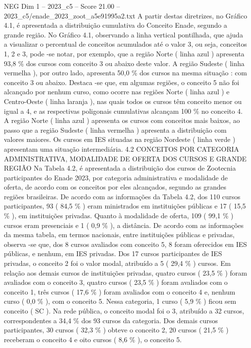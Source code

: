 \begin{textsample}{NEG Dim 1 – 2023\_c5 – Score 21.00 – 2023\_c5/enade\_2023\_zoot\_a5e91995a2.txt}
A partir destas diretrizes, no Gráfico 4.1, é apresentada a distribuição cumulativa do Conceito Enade, segundo a grande região.
No Gráfico 4.1, observando a linha vertical pontilhada, que ajuda a visualizar o percentual de conceitos acumulados até o valor 3, ou seja, conceitos 1, 2 e 3, pode -se notar, por exemplo, que a região Norte ( linha azul ) apresenta 93,8 \% dos cursos com conceito 3 ou abaixo deste valor.
A região Sudeste ( linha vermelha ), por outro lado, apresenta 50,0 \% dos cursos na mesma situação : com conceito 3 ou abaixo.
Destaca -se que, em algumas regiões, o conceito 5 não foi alcançado por nenhum curso, como ocorre nas regiões Norte ( linha azul ) e Centro-Oeste ( linha laranja ), nas quais todos os cursos têm conceito menor ou igual a 4, e as respectivas poligonais cumulativas alcançam 100 \% no conceito 4.
A região Norte ( linha azul ) apresenta os cursos com conceitos mais baixos, ao passo que a região Sudeste ( linha vermelha ) apresenta a distribuição com valores maiores.
Os cursos em IES situadas na região Nordeste ( linha verde ) apresentam uma situação intermediária. 4.2 CONCEITOS POR CATEGORIA ADMINISTRATIVA, MODALIDADE DE OFERTA DOS CURSOS E GRANDE REGIÃO Na Tabela 4.2, é apresentada a distribuição dos cursos de Zootecnia participantes do Enade 2023, por categoria administrativa e modalidade de oferta, de acordo com os conceitos por eles alcançados, segundo as grandes regiões brasileiras.
De acordo com as informações da Tabela 4.2, dos 110 cursos participantes, 93 ( 84,5 \% ) eram ministrados em instituições públicas e 17 ( 15,5 \% ), em instituições privadas.
Quanto à modalidade de oferta, 109 ( 99,1 \% ) cursos eram presenciais e 1 ( 0,9 \% ), a distância.
De acordo com as informações da mesma tabela, em termos nacionais, entre instituições públicas e privadas, observa -se que, dos 8 cursos avaliados com conceito 5, 8 foram oferecidos em IES públicas, e nenhum, em IES privadas.
Dos 17 cursos participantes de IES privadas, o conceito 2 foi o valor modal, atribuído a 5 ( 29,4 \% ) cursos.
Em relação aos demais cursos de instituições privadas, quatro cursos ( 23,5 \% ) foram avaliados com o conceito 3, quatro cursos ( 23,5 \% ) foram avaliados com o conceito 1, três cursos ( 17,6 \% ) foram avaliados com o conceito 4 e, nenhum curso ( 0,0 \% ), com o conceito 5.
Nessa categoria, 1 curso ( 5,9 \% ) ficou sem conceito ( SC ).
Na rede pública, o conceito modal foi o 3, atribuído a 32 cursos, correspondentes a 34,4 \% dos 93 cursos da categoria.
Dos demais cursos participantes, 30 cursos ( 32,3 \% ) obteve o conceito 2, 20 cursos ( 21,5 \% ) receberam o conceito 4 e oito cursos ( 8,6 \% ), o conceito 5.

\end{textsample}
